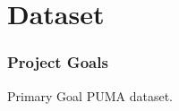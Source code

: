 \documentclass[../main.tex]{subfiles}
\begin{document}
\section{Dataset}
\begin{frame}[t]
    \frametitle{Project Goals}

    \begin{block}{Primary Goal}
        PUMA dataset.
    \end{block}
\end{frame}
\end{document}
